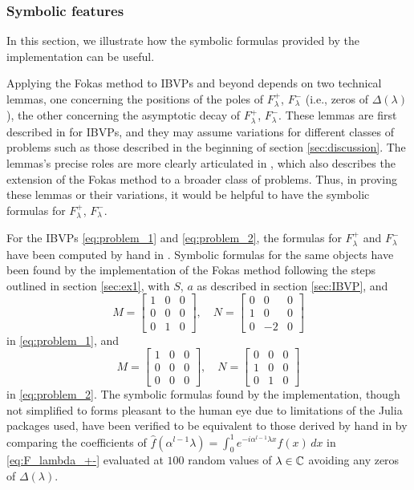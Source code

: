 \documentclass[12pt, oneside, a4paper]{article}
\begin{document}
\subsubsection{Symbolic features}\label{sec:symbolic_features}

In this section, we illustrate how the symbolic formulas provided by the implementation can be useful.

Applying the Fokas method to IBVPs and beyond depends on two technical lemmas, one concerning the positions of the poles of $F^+_\lambda$, $F^-_\lambda$ (i.e., zeros of $\Delta(\lambda)$), the other concerning the asymptotic decay of $F^+_\lambda$, $F^-_\lambda$. These lemmas are first described in \cite{Smith2012} for IBVPs, and they may assume variations for different classes of problems such as those described in the beginning of section \ref{sec:discussion}. The lemmas's precise roles are more clearly articulated in \cite{Miller2018}, which also describes the extension of the Fokas method to a broader class of problems. Thus, in proving these lemmas or their variations, it would be helpful to have the symbolic formulas for $F^+_\lambda$, $F^-_\lambda$.

For the IBVPs \eqref{eq:problem_1} and \eqref{eq:problem_2}, the formulas for $F_\lambda^+$ and $F_\lambda^-$ have been computed by hand in \cite[p. 1-4]{Smith2016}. Symbolic formulas for the same objects have been found by the implementation of the Fokas method following the steps outlined in section \ref{sec:ex1}, with $S$, $a$ as described in section \ref{sec:IBVP}, and
\[M = \begin{bmatrix}1 & 0 & 0\\ 0 & 0 & 0\\ 0 & 1 & 0\end{bmatrix},\quad N = \begin{bmatrix} 0 & 0 & 0\\ 1 & 0 & 0 \\ 0 & -2 & 0\end{bmatrix}\]
in \eqref{eq:problem_1}, and 
\[M = \begin{bmatrix}1 & 0 & 0\\ 0 & 0 & 0\\ 0 & 0 & 0\end{bmatrix},\quad N = \begin{bmatrix} 0 & 0 & 0\\ 1 & 0 & 0 \\ 0 & 1 & 0\end{bmatrix}\]
in \eqref{eq:problem_2}. The symbolic formulas found by the implementation, though not simplified to forms pleasant to the human eye due to limitations of the Julia packages used, have been verified to be equivalent to those derived by hand in \cite{Smith2016} by comparing the coefficients of $\hat{f}(\alpha^{l-1}\lambda) = \int_0^1 e^{-i\alpha^{l-1}\lambda x}f(x)\,dx$ in \eqref{eq:F_lambda_+-} evaluated at $100$ random values of $\lambda\in\mathbb C$ avoiding any zeros of $\Delta(\lambda)$.
\end{document}
